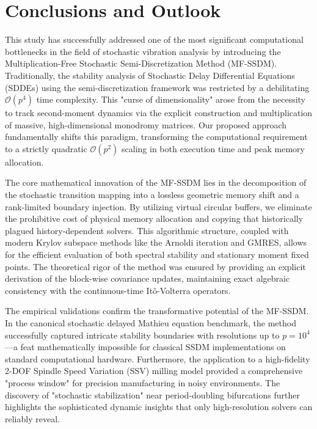 \documentclass[preprint,12pt]{elsarticle}
\begin{document}
\section{Conclusions and Outlook}
\label{sec:conclusions}

This study has successfully addressed one of the most significant computational bottlenecks in the field of stochastic vibration analysis by introducing the Multiplication-Free Stochastic Semi-Discretization Method (MF-SSDM). Traditionally, the stability analysis of Stochastic Delay Differential Equations (SDDEs) using the semi-discretization framework was restricted by a debilitating $\mathcal{O}(p^4)$ time complexity. This "curse of dimensionality" arose from the necessity to track second-moment dynamics via the explicit construction and multiplication of massive, high-dimensional monodromy matrices. Our proposed approach fundamentally shifts this paradigm, transforming the computational requirement to a strictly quadratic $\mathcal{O}(p^2)$ scaling in both execution time and peak memory allocation.

The core mathematical innovation of the MF-SSDM lies in the decomposition of the stochastic transition mapping into a lossless geometric memory shift and a rank-limited boundary injection. By utilizing virtual circular buffers, we eliminate the prohibitive cost of physical memory allocation and copying that historically plagued history-dependent solvers. This algorithmic structure, coupled with modern Krylov subspace methods like the Arnoldi iteration and GMRES, allows for the efficient evaluation of both spectral stability and stationary moment fixed points. The theoretical rigor of the method was ensured by providing an explicit derivation of the block-wise covariance updates, maintaining exact algebraic consistency with the continuous-time It\^o-Volterra operators.

The empirical validations confirm the transformative potential of the MF-SSDM. In the canonical stochastic delayed Mathieu equation benchmark, the method successfully captured intricate stability boundaries with resolutions up to $p=10^4$—a feat mathematically impossible for classical SSDM implementations on standard computational hardware. Furthermore, the application to a high-fidelity 2-DOF Spindle Speed Variation (SSV) milling model provided a comprehensive "process window" for precision manufacturing in noisy environments. The discovery of "stochastic stabilization" near period-doubling bifurcations further highlights the sophisticated dynamic insights that only high-resolution solvers can reliably reveal.
\end{document}
